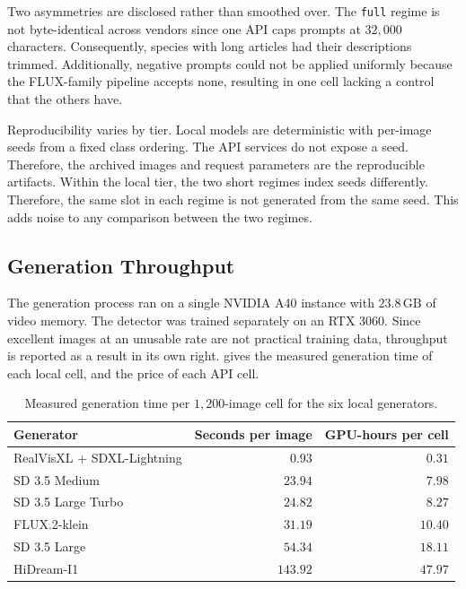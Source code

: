 Two asymmetries are disclosed rather than smoothed over. The \texttt{full} regime is not byte-identical across vendors since one API caps prompts at $32{,}000$ characters. Consequently, species with long articles had their descriptions trimmed. Additionally, negative prompts could not be applied uniformly because the FLUX-family pipeline accepts none, resulting in one cell lacking a control that the others have.

Reproducibility varies by tier. Local models are deterministic with per-image seeds from a fixed class ordering. The API services do not expose a seed. Therefore, the archived images and request parameters are the reproducible artifacts. Within the local tier, the two short regimes index seeds differently. Therefore, the same slot in each regime is not generated from the same seed. This adds noise to any comparison between the two regimes.

\subsection{Generation Throughput}\label{sec:generator_comparison_cost}

The generation process ran on a single NVIDIA A40 instance with $23.8\,\mathrm{GB}$ of video memory. The detector was trained separately on an RTX 3060. Since excellent images at an unusable rate are not practical training data, throughput is reported as a result in its own right.  gives the measured generation time of each local cell, and  the price of each API cell.

\begin{table}[htbp]
\centering
\caption[Measured generation time per local cell]{Measured generation time per $1{,}200$-image cell for the six local generators.}
\label{tab:generator-throughput}
\begin{tabular}{@{}lrr@{}}
\toprule
Generator & Seconds per image & GPU-hours per cell \\
\midrule
RealVisXL + SDXL-Lightning & $0.93$ & $0.31$ \\
SD 3.5 Medium & $23.94$ & $7.98$ \\
SD 3.5 Large Turbo & $24.82$ & $8.27$ \\
FLUX.2-klein & $31.19$ & $10.40$ \\
SD 3.5 Large & $54.34$ & $18.11$ \\
HiDream-I1 & $143.92$ & $47.97$ \\
\bottomrule
\end{tabular}
\end{table}

